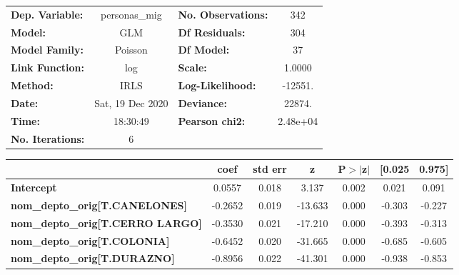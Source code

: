 \begin{center}
\begin{tabular}{lclc}
\toprule
\textbf{Dep. Variable:}                     &  personas\_mig   & \textbf{  No. Observations:  } &      342    \\
\textbf{Model:}                             &       GLM        & \textbf{  Df Residuals:      } &      304    \\
\textbf{Model Family:}                      &     Poisson      & \textbf{  Df Model:          } &       37    \\
\textbf{Link Function:}                     &       log        & \textbf{  Scale:             } &    1.0000   \\
\textbf{Method:}                            &       IRLS       & \textbf{  Log-Likelihood:    } &   -12551.   \\
\textbf{Date:}                              & Sat, 19 Dec 2020 & \textbf{  Deviance:          } &    22874.   \\
\textbf{Time:}                              &     18:30:49     & \textbf{  Pearson chi2:      } &  2.48e+04   \\
\textbf{No. Iterations:}                    &        6         & \textbf{                     } &             \\
\bottomrule
\end{tabular}
\begin{tabular}{lcccccc}
                                            & \textbf{coef} & \textbf{std err} & \textbf{z} & \textbf{P$> |$z$|$} & \textbf{[0.025} & \textbf{0.975]}  \\
\midrule
\textbf{Intercept}                          &       0.0557  &        0.018     &     3.137  &         0.002        &        0.021    &        0.091     \\
\textbf{nom\_depto\_orig[T.CANELONES]}      &      -0.2652  &        0.019     &   -13.633  &         0.000        &       -0.303    &       -0.227     \\
\textbf{nom\_depto\_orig[T.CERRO LARGO]}    &      -0.3530  &        0.021     &   -17.210  &         0.000        &       -0.393    &       -0.313     \\
\textbf{nom\_depto\_orig[T.COLONIA]}        &      -0.6452  &        0.020     &   -31.665  &         0.000        &       -0.685    &       -0.605     \\
\textbf{nom\_depto\_orig[T.DURAZNO]}        &      -0.8956  &        0.022     &   -41.301  &         0.000        &       -0.938    &       -0.853     \\

\end{tabular}
\end{center}
